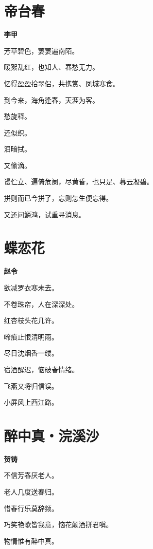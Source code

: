 \documentclass[12pt,a4paper]{ctexbook}
\begin{document}
\section{帝台春}
\textbf{李甲}\par\vspace{0.5em}
芳草碧色，萋萋遍南陌。\par
暖絮乱红，也知人、春愁无力。\par
忆得盈盈拾翠侣，共携赏、凤城寒食。\par
到今来，海角逢春，天涯为客。\par
愁旋释。\par
还似织。\par
泪暗拭。\par
又偷滴。\par
谩伫立、遍倚危阑，尽黄昏，也只是、暮云凝碧。\par
拼则而已今拼了，忘则怎生便忘得。\par
又还问鳞鸿，试重寻消息。\par

\section{蝶恋花}
\textbf{赵令}\par\vspace{0.5em}
欲减罗衣寒未去。\par
不卷珠帘，人在深深处。\par
红杏枝头花几许。\par
啼痕止恨清明雨。\par
尽日沈烟香一缕。\par
宿酒醒迟，恼破春情绪。\par
飞燕又将归信误。\par
小屏风上西江路。\par

\section{醉中真・浣溪沙}
\textbf{贺铸}\par\vspace{0.5em}
不信芳春厌老人。\par
老人几度送春归。\par
惜春行乐莫辞频。\par
巧笑艳歌皆我意，恼花颠酒拼君嗔。\par
物情惟有醉中真。\par
\end{document}
